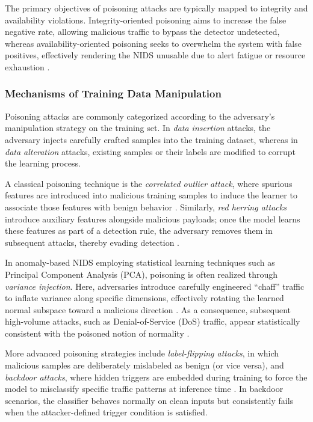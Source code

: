 The primary objectives of poisoning attacks are typically mapped to integrity and availability violations. 
Integrity-oriented poisoning aims to increase the false negative rate, allowing malicious traffic to bypass the detector undetected, whereas availability-oriented poisoning seeks to overwhelm the system with false positives, effectively rendering the NIDS unusable due to alert fatigue or resource exhaustion \cite{bao2018mitigating, ibitoye2025threat}.

\subsubsection{Mechanisms of Training Data Manipulation}

Poisoning attacks are commonly categorized according to the adversary’s manipulation strategy on the training set. 
In \emph{data insertion} attacks, the adversary injects carefully crafted samples into the training dataset, whereas in \emph{data alteration} attacks, existing samples or their labels are modified to corrupt the learning process.

A classical poisoning technique is the \emph{correlated outlier attack}, where spurious features are introduced into malicious training samples to induce the learner to associate those features with benign behavior \cite{huang2011adversarial}. 
Similarly, \emph{red herring attacks} introduce auxiliary features alongside malicious payloads; once the model learns these features as part of a detection rule, the adversary removes them in subsequent attacks, thereby evading detection \cite{huang2011adversarial}. 

In anomaly-based NIDS employing statistical learning techniques such as Principal Component Analysis (PCA), poisoning is often realized through \emph{variance injection}. 
Here, adversaries introduce carefully engineered ``chaff'' traffic to inflate variance along specific dimensions, effectively rotating the learned normal subspace toward a malicious direction \cite{rubinstein2009antidote}. 
As a consequence, subsequent high-volume attacks, such as Denial-of-Service (DoS) traffic, appear statistically consistent with the poisoned notion of normality \cite{rubinstein2009antidote}.

More advanced poisoning strategies include \emph{label-flipping attacks}, in which malicious samples are deliberately mislabeled as benign (or vice versa), and \emph{backdoor attacks}, where hidden triggers are embedded during training to force the model to misclassify specific traffic patterns at inference time \cite{abomakhelb2025comprehensive}. 
In backdoor scenarios, the classifier behaves normally on clean inputs but consistently fails when the attacker-defined trigger condition is satisfied.


